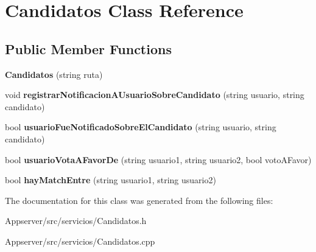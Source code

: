 \hypertarget{classCandidatos}{}\section{Candidatos Class Reference}
\label{classCandidatos}
\subsection*{Public Member Functions}
\begin{DoxyCompactItemize}
\item 
{\bfseries Candidatos} (string ruta)\hypertarget{classCandidatos_addc453f8a4be61234502e37b70855c52}{}\label{classCandidatos_addc453f8a4be61234502e37b70855c52}

\item 
void {\bfseries registrar\+Notificacion\+A\+Usuario\+Sobre\+Candidato} (string usuario, string candidato)\hypertarget{classCandidatos_a7eea8f2e1a19d605678588f482b97b08}{}\label{classCandidatos_a7eea8f2e1a19d605678588f482b97b08}

\item 
bool {\bfseries usuario\+Fue\+Notificado\+Sobre\+El\+Candidato} (string usuario, string candidato)\hypertarget{classCandidatos_abb4837245d85e28e2b86ae05e133b310}{}\label{classCandidatos_abb4837245d85e28e2b86ae05e133b310}

\item 
bool {\bfseries usuario\+Vota\+A\+Favor\+De} (string usuario1, string usuario2, bool voto\+A\+Favor)\hypertarget{classCandidatos_acb549bd56eefbc3c6f0f9cffd1a75f29}{}\label{classCandidatos_acb549bd56eefbc3c6f0f9cffd1a75f29}

\item 
bool {\bfseries hay\+Match\+Entre} (string usuario1, string usuario2)\hypertarget{classCandidatos_a3d96ff8c128d242975635a9839046f7b}{}\label{classCandidatos_a3d96ff8c128d242975635a9839046f7b}

\end{DoxyCompactItemize}


The documentation for this class was generated from the following files\+:\begin{DoxyCompactItemize}
\item 
Appserver/src/servicios/Candidatos.\+h\item 
Appserver/src/servicios/Candidatos.\+cpp\end{DoxyCompactItemize}
